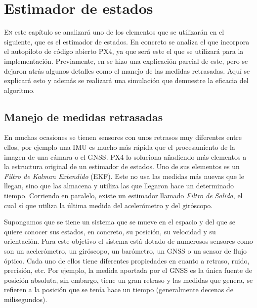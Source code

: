 \chapter{Estimador de estados}\label{chp:est}

\lettrine[lraise=-0.1, lines=2, loversize=0.2]{E}{n} este capítulo se analizará uno de los elementos que se utilizarán en el siguiente, que es el estimador de estados. En concreto se analiza el que incorpora el autopiloto de código abierto PX4, ya que será este el que se utilizará para la implementación. Previamente, en \cite{arias2019control} se hizo una explicación parcial de este, pero se dejaron atrás algunos detalles como el manejo de las medidas retrasadas. Aquí se explicará esto y además se realizará una simulación que demuestre la eficacia del algoritmo.

\section{Manejo de medidas retrasadas}
En muchas ocasiones se tienen sensores con unos retrasos muy diferentes entre ellos, por ejemplo una IMU es mucho más rápida que el procesamiento de la imagen de una cámara o el GNSS. PX4 lo soluciona añadiendo más elementos a la estructura original de un estimador de estados. Uno de sus elementos es un \textit{Filtro de Kalman Extendido} (EKF). Este no usa las medidas más nuevas que le llegan, sino que las almacena y utiliza las que llegaron hace un determinado tiempo. Corriendo en paralelo, existe un estimador llamado \textit{Filtro de Salida}, el cual sí que utiliza la última medida del acelerómetro y del giróscopo. 


Supongamos que se tiene un sistema que se mueve en el espacio y del que se quiere conocer sus estados, en concreto, su posición, su velocidad y su orientación. Para este objetivo el sistema está dotado de numerosos sensores como son un acelerómetro, un giróscopo, un barómetro, un GNSS o un sensor de flujo óptico. Cada uno de ellos tiene diferentes propiedades en cuanto a retraso, ruido, precisión, etc. Por ejemplo, la medida aportada por el GNSS es la única fuente de posición absoluta, sin embargo, tiene un gran retraso y las medidas que genera, se refieren a la posición que se tenía hace un tiempo (generalmente decenas de milisegundos). 

